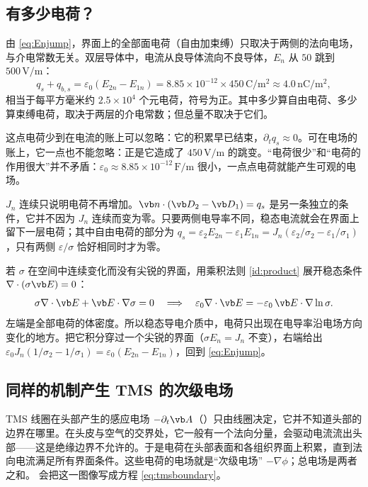\subsection{有多少电荷？}
由 \eqref{eq:Enjump}，界面上的全部面电荷（自由加束缚）只取决于两侧的法向电场，与介电常数无关。双层导体中，电流从良导体流向不良导体，$E_n$ 从 $50$ 跳到 $500\,\mathrm{V/m}$：
\begin{equation}
q_{s}+q_{b,s}=\varepsilon_0(E_{2n}-E_{1n})=8.85\times10^{-12}\times450\,\mathrm{C/m^2}\approx4.0\,\mathrm{nC/m^2},
\end{equation}
相当于每平方毫米约 $2.5\times10^4$ 个元电荷，符号为正。其中多少算自由电荷、多少算束缚电荷，取决于两层的介电常数；但总量不取决于它们。

这点电荷少到在电流的账上可以忽略：它的积累早已结束，$\partial_tq_s\approx0$。可在电场的账上，它一点也不能忽略：正是它造成了 $450\,\mathrm{V/m}$ 的跳变。“电荷很少”和“电荷的作用很大”并不矛盾：$\varepsilon_0\approx8.85\times10^{-12}\,\mathrm{F/m}$ 很小，一点点电荷就能产生可观的电场。

\begin{pitfall}
$J_n$ 连续只说明电荷不再增加。$\vb n\cdot(\vb D_2-\vb D_1)=q_s$ 是另一条独立的条件，它并不因为 $J_n$ 连续而变为零。只要两侧电导率不同，稳态电流就会在界面上留下一层电荷；其中自由电荷的部分为 $q_s=\varepsilon_2E_{2n}-\varepsilon_1E_{1n}=J_n(\varepsilon_2/\sigma_2-\varepsilon_1/\sigma_1)$，只有两侧 $\varepsilon/\sigma$ 恰好相同时才为零。
\end{pitfall}

\begin{deeper}
若 $\sigma$ 在空间中连续变化而没有尖锐的界面，用乘积法则 \eqref{id:product} 展开稳态条件 $\nabla\cdot(\sigma\vb E)=0$：
\begin{equation*}
\sigma\nabla\cdot\vb E+\vb E\cdot\nabla\sigma=0\quad\Longrightarrow\quad \varepsilon_0\nabla\cdot\vb E=-\varepsilon_0\,\vb E\cdot\nabla\ln\sigma .
\end{equation*}
左端是全部电荷的体密度。所以稳态导电介质中，电荷只出现在电导率沿电场方向变化的地方。把它积分穿过一个尖锐的界面（$\sigma E_n=J_n$ 不变），右端给出 $\varepsilon_0J_n(1/\sigma_2-1/\sigma_1)=\varepsilon_0(E_{2n}-E_{1n})$，回到 \eqref{eq:Enjump}。
\end{deeper}

\subsection{同样的机制产生 TMS 的次级电场}
TMS 线圈在头部产生的感应电场 $-\partial_t\vb A$（）只由线圈决定，它并不知道头部的边界在哪里。在头皮与空气的交界处，它一般有一个法向分量，会驱动电流流出头部——这是绝缘边界不允许的。于是电荷在头部表面和各组织界面上积累，直到法向电流满足所有界面条件。这些电荷的电场就是“次级电场” $-\nabla\phi$；总电场是两者之和。 会把这一图像写成方程 \eqref{eq:tmsboundary}。

